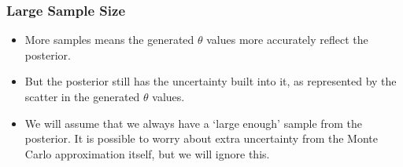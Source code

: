 \documentclass{beamer}
\begin{document}
\begin{frame}
\frametitle{Large Sample Size}

\begin{itemize}
\item More samples means the generated $\theta$ values more accurately
reflect the posterior.\pause
\item But the posterior still has the uncertainty built into it, as represented
by the scatter in the generated $\theta$ values.\pause
\item We will assume that we always have a `large enough'
sample from the posterior. It is possible to worry about extra
uncertainty from the Monte Carlo approximation itself, but we will ignore this.
\end{itemize}

\end{frame}
\end{document}
